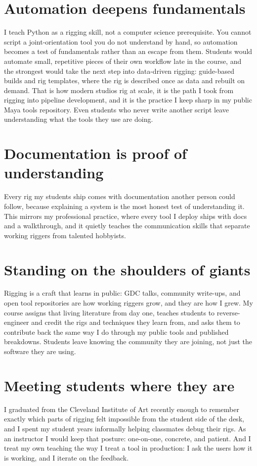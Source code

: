 \documentclass[11pt,a4paper]{article}
\begin{document}
\section{Automation deepens fundamentals}
I teach Python as a rigging skill, not a computer science prerequisite. You cannot script a joint-orientation tool you do not understand by hand, so automation becomes a test of fundamentals rather than an escape from them. Students would automate small, repetitive pieces of their own workflow late in the course, and the strongest would take the next step into data-driven rigging: guide-based builds and rig templates, where the rig is described once as data and rebuilt on demand. That is how modern studios rig at scale, it is the path I took from rigging into pipeline development, and it is the practice I keep sharp in my public Maya tools repository. Even students who never write another script leave understanding what the tools they use are doing.

\section{Documentation is proof of understanding}
Every rig my students ship comes with documentation another person could follow, because explaining a system is the most honest test of understanding it. This mirrors my professional practice, where every tool I deploy ships with docs and a walkthrough, and it quietly teaches the communication skills that separate working riggers from talented hobbyists.

\section{Standing on the shoulders of giants}
Rigging is a craft that learns in public: GDC talks, community write-ups, and open tool repositories are how working riggers grow, and they are how I grew. My course assigns that living literature from day one, teaches students to reverse-engineer and credit the rigs and techniques they learn from, and asks them to contribute back the same way I do through my public tools and published breakdowns. Students leave knowing the community they are joining, not just the software they are using.

\section{Meeting students where they are}
I graduated from the Cleveland Institute of Art recently enough to remember exactly which parts of rigging felt impossible from the student side of the desk, and I spent my student years informally helping classmates debug their rigs. As an instructor I would keep that posture: one-on-one, concrete, and patient. And I treat my own teaching the way I treat a tool in production: I ask the users how it is working, and I iterate on the feedback.
\end{document}

